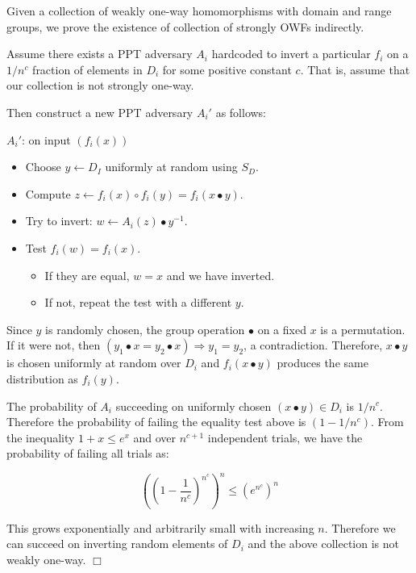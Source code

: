 \documentclass[12pt]{article}
\begin{document}
Given a collection of weakly one-way homomorphisms with
domain and range groups,
we prove the existence of collection of strongly OWFs
indirectly.

Assume there exists a PPT adversary $A_i$ hardcoded to invert a particular
$f_i$ on a $1/n^c$ fraction of elements in $D_i$
for some positive constant $c$.
That is, assume that our collection is not strongly one-way.

Then construct a new PPT adversary $A_i'$ as follows:

$A_i'$: on input $(f_i(x))$
\begin{itemize}
\item Choose $y \gets D_I$ uniformly at random using $S_D$.
\item Compute $z \gets f_i(x)\circ f_i(y) = f_i(x \bullet y)$.
\item Try to invert: $w \gets A_i(z)\bullet y^{-1}$.
\item Test $f_i(w) = f_i(x)$.
\begin{itemize}
\item If they are equal, $w=x$ and we have inverted.
\item If not, repeat the test with a different $y$.
\end{itemize}
\end{itemize}

Since $y$ is randomly chosen, the group operation $\bullet$ on a fixed $x$
is a permutation. If it were not, then
$(y_1\bullet x = y_2\bullet x) \Rightarrow y_1 = y_2$, a contradiction.
Therefore, $x \bullet y$ is chosen uniformly at random over $D_i$ and
$f_i(x \bullet y)$ produces the same distribution as $f_i(y)$.

The probability of $A_i$ succeeding on uniformly chosen $(x \bullet y) \in D_i$
is $1/n^c$. Therefore the probability of failing the equality test above
is $(1 - 1/n^c)$. From the inequality $1+x \le e^x$ and over $n^{c+1}$
independent trials, we have the probability of failing all trials as:

\begin{displaymath}
((1 - \frac{1}{n^c})^{n^{c}})^n \le (e^{n^c})^n
\end{displaymath}

This grows exponentially and arbitrarily small with increasing $n$.
Therefore we can succeed on inverting random elements of $D_i$ and the
above collection is not weakly one-way.
$\Box$

\pagebreak

\end{document}
